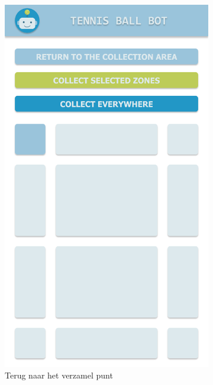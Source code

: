 \begin{figure}[H]
    \begin{subfigure}{0.3\textwidth}
        \includegraphics[width=0.9\linewidth]{img/mode-1.png} 
        \caption{Terug naar het verzamel punt}
        \label{fig:mode1}
    \end{subfigure}
    \begin{subfigure}{0.3\textwidth}

\end{subfigure}
\end{figure}
